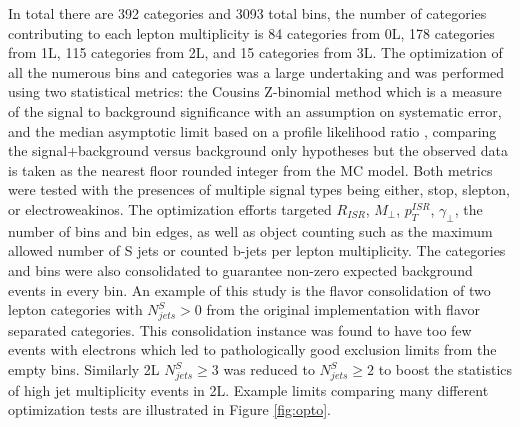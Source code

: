In total there are 392 categories and 3093 total bins, the number of categories contributing to each lepton multiplicity is 84 categories from 0L, 178 categories from 1L, 115 categories from 2L, and 15 categories from 3L. The optimization of all the numerous bins and categories was a large undertaking and was performed using two statistical metrics: the Cousins Z-binomial method \cite{Cousins_2008} which is a measure of the signal to background significance with an assumption on systematic error, and the median asymptotic limit based on a profile likelihood ratio \cite{Cowan:2010js}, comparing the signal+background versus background only hypotheses but the observed data is taken as the nearest floor rounded integer from the MC model. Both metrics were tested with the presences of multiple signal types being either, stop, slepton, or electroweakinos. The optimization efforts targeted $R_{ISR}$, $M_\perp$, $p_T^{ISR}$, $\gamma_\perp$, the number of bins and bin edges, as well as object counting such as the  maximum allowed number of S jets or counted b-jets per lepton multiplicity. The categories and bins were also consolidated to guarantee non-zero expected background events in every bin. An example of this study is the flavor consolidation of two lepton categories with $N_{jets}^S > 0$ from the original implementation with flavor separated categories. This consolidation instance was found to have too few events with electrons which led to pathologically good exclusion limits from the empty bins. Similarly 2L $N_{jets}^S \geq 3$  was reduced to $N_{jets}^S \geq 2$ to boost the statistics of high jet multiplicity events in 2L. Example limits comparing many different optimization tests are illustrated in Figure \ref{fig:opto}.

